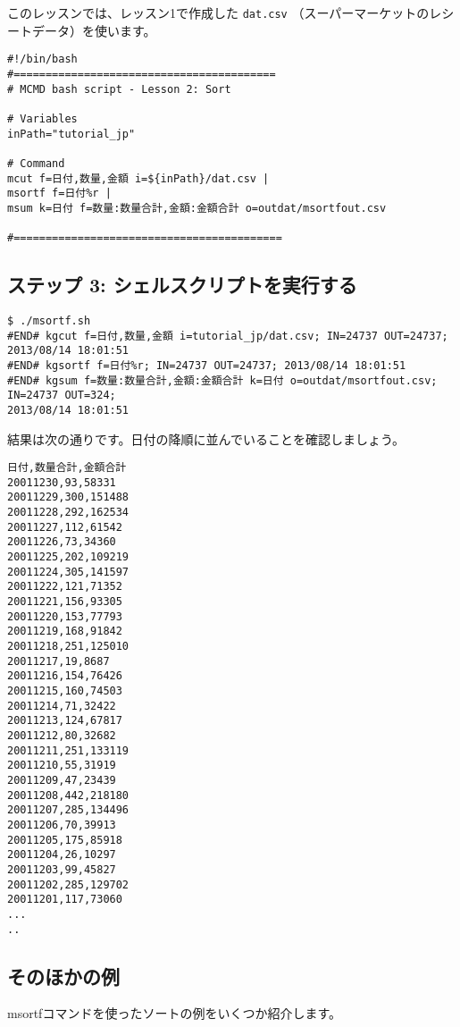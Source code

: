 このレッスンでは、レッスン1で作成した \verb|dat.csv| （スーパーマーケットのレシートデータ）を使います。

\begin{verbatim}
#!/bin/bash
#=========================================
# MCMD bash script - Lesson 2: Sort 

# Variables
inPath="tutorial_jp"

# Command 
mcut f=日付,数量,金額 i=${inPath}/dat.csv |
msortf f=日付%r |       
msum k=日付 f=数量:数量合計,金額:金額合計 o=outdat/msortfout.csv

#==========================================
\end{verbatim}

\subsection{ステップ 3: シェルスクリプトを実行する}

\begin{verbatim}
$ ./msortf.sh 
#END# kgcut f=日付,数量,金額 i=tutorial_jp/dat.csv; IN=24737 OUT=24737; 2013/08/14 18:01:51
#END# kgsortf f=日付%r; IN=24737 OUT=24737; 2013/08/14 18:01:51
#END# kgsum f=数量:数量合計,金額:金額合計 k=日付 o=outdat/msortfout.csv; IN=24737 OUT=324;
2013/08/14 18:01:51
\end{verbatim}

\noindent
結果は次の通りです。日付の降順に並んでいることを確認しましょう。

\begin{verbatim}
日付,数量合計,金額合計
20011230,93,58331
20011229,300,151488
20011228,292,162534
20011227,112,61542
20011226,73,34360
20011225,202,109219
20011224,305,141597
20011222,121,71352
20011221,156,93305
20011220,153,77793
20011219,168,91842
20011218,251,125010
20011217,19,8687
20011216,154,76426
20011215,160,74503
20011214,71,32422
20011213,124,67817
20011212,80,32682
20011211,251,133119
20011210,55,31919
20011209,47,23439
20011208,442,218180
20011207,285,134496
20011206,70,39913
20011205,175,85918
20011204,26,10297
20011203,99,45827
20011202,285,129702
20011201,117,73060
...
..
\end{verbatim}

\subsection{そのほかの例}

\noindent

msortfコマンドを使ったソートの例をいくつか紹介します。\\

